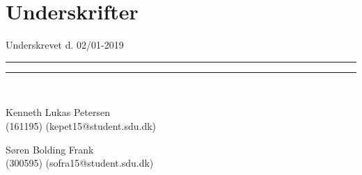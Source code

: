 
\section*{Underskrifter}
\vspace{3ex} \hfill Underskrevet d. 02/01-2019\\

\newlength{\streg} \setlength{\streg}{0.49\linewidth}

\vspace*{\fill} \rule{\streg}{1pt} \hfill \rule{\streg}{1pt}\\
\begin{minipage}[b]{\streg}
 \centering
 \rule{0pt}{4ex}
 Kenneth Lukas Petersen \\
 {\footnotesize (161195) (kepet15@student.sdu.dk)}
\end{minipage}
\hfill
\begin{minipage}[b]{\streg}
 \centering
Søren Bolding Frank \\
 {\footnotesize (300595) (sofra15@student.sdu.dk)}
\end{minipage}
\vspace*{\fill}